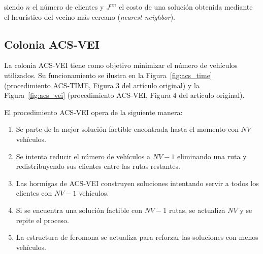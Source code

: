 \documentclass[12pt, letterpaper]{article}
\begin{document}
\noindent siendo $n$ el número de clientes y $J^{nn}$ el costo de una solución obtenida mediante el heurístico del vecino más cercano (\textit{nearest neighbor}).

\subsection{Colonia ACS-VEI}
\label{subsec:acs_vei}

La colonia ACS-VEI tiene como objetivo minimizar el número de vehículos utilizados. Su funcionamiento se ilustra en la Figura~\ref{fig:acs_time} (procedimiento ACS-TIME, Figura 3 del artículo original) y la Figura~\ref{fig:acs_vei} (procedimiento ACS-VEI, Figura 4 del artículo original).

El procedimiento ACS-VEI opera de la siguiente manera:
\begin{enumerate}[leftmargin=2cm]
  \item Se parte de la mejor solución factible encontrada hasta el momento con $NV$ vehículos.
  \item Se intenta reducir el número de vehículos a $NV - 1$ eliminando una ruta y redistribuyendo sus clientes entre las rutas restantes.
  \item Las hormigas de ACS-VEI construyen soluciones intentando servir a todos los clientes con $NV - 1$ vehículos.
  \item Si se encuentra una solución factible con $NV - 1$ rutas, se actualiza $NV$ y se repite el proceso.
  \item La estructura de feromona se actualiza para reforzar las soluciones con menos vehículos.
\end{enumerate}
\end{document}
